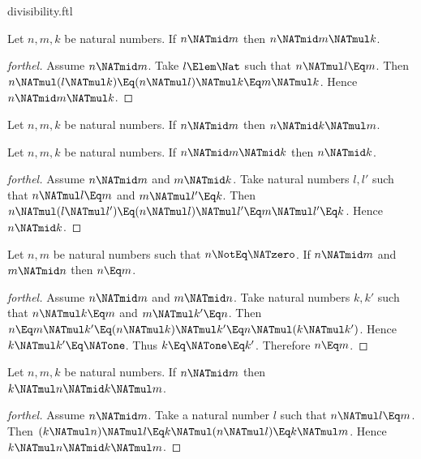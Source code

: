 \documentclass{stex}
\begin{document}
\begin{smodule}{divisibility.ftl}
\begin{proposition}[forthel,id=ARITHMETIC_07_7463519983239168]
  Let $n, m, k$ be natural numbers.
  If $n \NATmid m$ then $n \NATmid m \NATmul k$.
\end{proposition}
\begin{proof}[forthel]
  Assume $n \NATmid m$.
  Take $l \Elem \Nat$ such that $n \NATmul l \Eq m$.
  Then $n \NATmul (l \NATmul k)
    \Eq (n \NATmul l) \NATmul k
    \Eq m \NATmul k$.
  Hence $n \NATmid m \NATmul k$.
\end{proof}

\begin{corollary}[forthel,id=ARITHMETIC_07_1588185794609152]
  Let $n, m, k$ be natural numbers.
  If $n \NATmid m$ then $n \NATmid k \NATmul m$.
\end{corollary}

\begin{proposition}[forthel,id=ARITHMETIC_07_7863858316181504]
  Let $n, m, k$ be natural numbers.
  If $n \NATmid m \NATmid k$ then $n \NATmid k$.
\end{proposition}
\begin{proof}[forthel]
  Assume $n \NATmid m$ and $m \NATmid k$.
  Take natural numbers $l,l'$ such that $n \NATmul l \Eq m$ and $m \NATmul l' \Eq k$.
  Then $n \NATmul (l \NATmul l')
    \Eq (n \NATmul l) \NATmul l'
    \Eq m \NATmul l'
    \Eq k$.
  Hence $n \NATmid k$.
\end{proof}

\begin{proposition}[forthel,id=ARITHMETIC_07_4933275640397824]
  Let $n, m$ be natural numbers such that $n \NotEq \NATzero$.
  If $n \NATmid m$ and $m \NATmid n$ then $n \Eq m$.
\end{proposition}
\begin{proof}[forthel]
  Assume $n \NATmid m$ and $m \NATmid n$.
  Take natural numbers $k,k'$ such that $n \NATmul k \Eq m$ and $m \NATmul k' \Eq n$.
  Then $n
    \Eq m \NATmul k'
    \Eq (n \NATmul k) \NATmul k'
    \Eq n \NATmul (k \NATmul k')$.
  Hence $k \NATmul k' \Eq \NATone$.
  Thus $k \Eq \NATone \Eq k'$.
  Therefore $n \Eq m$.
\end{proof}

\begin{proposition}[forthel,id=ARITHMETIC_07_1283495225720832]
  Let $n, m, k$ be natural numbers.
  If $n \NATmid m$ then $k \NATmul n \NATmid k \NATmul m$.
\end{proposition}
\begin{proof}[forthel]
  Assume $n \NATmid m$.
  Take a natural number $l$ such that $n \NATmul l \Eq m$.
  Then $(k \NATmul n) \NATmul l
    \Eq k \NATmul (n \NATmul l)
    \Eq k \NATmul m$.
  Hence $k \NATmul n \NATmid k \NATmul m$.
\end{proof}


\end{smodule}
\end{document}

